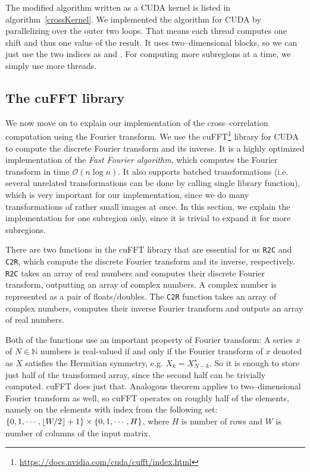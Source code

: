 The modified algorithm written as a CUDA kernel is listed in algorithm~\ref{crossKernel}. We implemented the algorithm for CUDA by parallelizing over the outer two loops. That means each thread computes one shift and thus one value of the result. It uses two--dimensional blocks, so we can just use the two indices as  and . For computing more subregions at a time, we simply use more threads.



\subsection{The cuFFT library}
We now move on to explain our implementation of the cross--correlation computation using the Fourier transform. We use the cuFFT\footnote{\url{https://docs.nvidia.com/cuda/cufft/index.html}} library for CUDA to compute the discrete Fourier transform and its inverse. It is a highly optimized implementation of the \emph{Fast Fourier algorithm}, which computes the Fourier transform in time $\mathcal{O}(n \log n)$. It also supports batched transformations (i.e. several unrelated transformations can be done by calling single library function), which is very important for our implementation, since we do many transformations of rather small images at once. In this section, we explain the implementation for one subregion only, since it is trivial to expand it for more subregions.

There are two functions in the cuFFT library that are essential for us \texttt{R2C} and \texttt{C2R}, which compute the discrete Fourier transform and its inverse, respectively. \texttt{R2C} takes an array of real numbers and computes their discrete Fourier transform, outputting an array of complex numbers. A complex number is represented as a pair of floats/doubles. The \texttt{C2R} function takes an array of complex numbers, computes their inverse Fourier transform and outputs an array of real numbers.

Both of the functions use an important property of Fourier transform: A series $x$ of $N \in \mathbb{N}$ numbers is real-valued if and only if the Fourier transform of $x$ denoted as $X$ satisfies the Hermitian symmetry, e.g. $X_k = X_{N-k}^\star$. So it is enough to store just half of the transformed array, since the second half can be trivially computed. cuFFT does just that. Analogous theorem applies to two--dimensional Fourier transform as well, so cuFFT operates on roughly half of the elements, namely on the elements with index from the following set: $\{0,1,\cdots, \lfloor W/2\rfloor + 1\} \times \{0, 1, \cdots, H\}$, where $H$ is number of rows and $W$ is number of columns of the input matrix.

